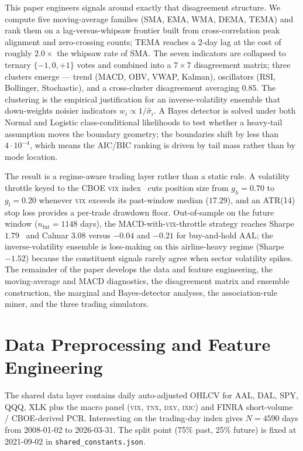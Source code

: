 \documentclass[runningheads]{llncs}
\begin{document}
This paper engineers signals around exactly that disagreement
structure. We compute five moving-average families (SMA, EMA, WMA,
DEMA, TEMA) and rank them on a lag-versus-whipsaw frontier built from
cross-correlation peak alignment and zero-crossing counts; TEMA
reaches a 2-day lag at the cost of roughly $2.0\!\times$ the whipsaw rate of
SMA. The seven indicators are collapsed to ternary $\{-1,0,+1\}$
votes and combined into a $7\!\times\!7$ disagreement matrix; three
clusters emerge --- trend (MACD, OBV, VWAP, Kalman), oscillators
(RSI, Bollinger, Stochastic), and a cross-cluster disagreement
averaging $0.85$. The clustering is the empirical justification for
an inverse-volatility ensemble that down-weights noisier indicators
$w_i\propto 1/\hat\sigma_i$. A Bayes detector is solved under both
Normal and Logistic class-conditional likelihoods to test whether a
heavy-tail assumption moves the boundary geometry; the boundaries
shift by less than $4\!\cdot\!10^{-4}$, which means the AIC/BIC
ranking is driven by tail mass rather than by mode location.

The result is a regime-aware trading layer rather than a static rule.
A volatility throttle keyed to the CBOE \textsc{vix}
index~\cite{whaley2000} cuts position size from $g_h{=}0.70$ to
$g_l{=}0.20$ whenever \textsc{vix} exceeds its past-window median
($\num{17.29}$), and an ATR(14) stop loss provides a per-trade
drawdown floor. Out-of-sample on the future window
($n_{\mathrm{fut}}{=}\num{1148}$ days), the MACD-with-\textsc{vix}-throttle
strategy reaches Sharpe~$\num{1.79}$~\cite{sharpe1966} and Calmar
$\num{3.08}$ versus $\num{-0.04}$ and $\num{-0.21}$ for buy-and-hold
AAL; the inverse-volatility ensemble is loss-making on this airline-heavy
regime (Sharpe $\num{-1.52}$) because the constituent signals rarely
agree when sector volatility spikes. The remainder of the
paper develops the data and feature engineering, the moving-average
and MACD diagnostics, the disagreement matrix and ensemble
construction, the marginal and Bayes-detector analyses, the
association-rule miner, and the three trading simulators.

\section{Data Preprocessing and Feature Engineering}\label{sec:data}
The shared data layer contains daily auto-adjusted OHLCV for AAL,
DAL, SPY, QQQ, XLK plus the macro panel (\textsc{vix}, \textsc{tnx},
\textsc{dxy}, \textsc{ixic}) and FINRA short-volume / CBOE-derived
PCR. Intersecting on the trading-day index gives
$N{=}\num{4590}$ days from 2008-01-02 to 2026-03-31. The split point
(\num{75}\% past, \num{25}\% future) is fixed at 2021-09-02 in
\texttt{shared\_constants.json}.
\end{document}
